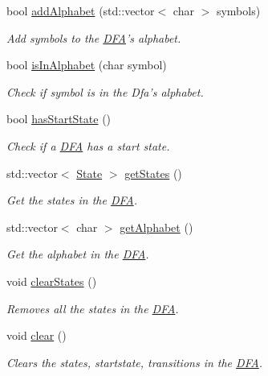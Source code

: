 \begin{DoxyCompactItemize}
bool \hyperlink{classFA_1_1DFA_a27f8b400bc8d0512a8527d6c71996869}{add\-Alphabet} (std\-::vector$<$ char $>$ symbols)
\begin{DoxyCompactList}\small\item\em Add symbols to the \hyperlink{classFA_1_1DFA}{D\-F\-A}'s alphabet. \end{DoxyCompactList}\item 
bool \hyperlink{classFA_1_1DFA_a8b9f3bbda0044b4ed8d413f5fa3cd56b}{is\-In\-Alphabet} (char symbol)
\begin{DoxyCompactList}\small\item\em Check if symbol is in the Dfa's alphabet. \end{DoxyCompactList}\item 
bool \hyperlink{classFA_1_1DFA_aec06d82c3ee0efdb193510d35031f36d}{has\-Start\-State} ()
\begin{DoxyCompactList}\small\item\em Check if a \hyperlink{classFA_1_1DFA}{D\-F\-A} has a start state. \end{DoxyCompactList}\item 
std\-::vector$<$ \hyperlink{classFA_1_1State}{State} $>$ \hyperlink{classFA_1_1DFA_a8751b056d570391389fa8a9db459595b}{get\-States} ()
\begin{DoxyCompactList}\small\item\em Get the states in the \hyperlink{classFA_1_1DFA}{D\-F\-A}. \end{DoxyCompactList}\item 
std\-::vector$<$ char $>$ \hyperlink{classFA_1_1DFA_a757d14f06b687278116d971f116cb322}{get\-Alphabet} ()
\begin{DoxyCompactList}\small\item\em Get the alphabet in the \hyperlink{classFA_1_1DFA}{D\-F\-A}. \end{DoxyCompactList}\item 
\hypertarget{classFA_1_1DFA_a7319fa99113f60a2575a2b66c35341bf}{void \hyperlink{classFA_1_1DFA_a7319fa99113f60a2575a2b66c35341bf}{clear\-States} ()}\label{classFA_1_1DFA_a7319fa99113f60a2575a2b66c35341bf}

\begin{DoxyCompactList}\small\item\em Removes all the states in the \hyperlink{classFA_1_1DFA}{D\-F\-A}. \end{DoxyCompactList}\item 
\hypertarget{classFA_1_1DFA_ac6576dd1df2dc56199aa14f22beb09d4}{void \hyperlink{classFA_1_1DFA_ac6576dd1df2dc56199aa14f22beb09d4}{clear} ()}\label{classFA_1_1DFA_ac6576dd1df2dc56199aa14f22beb09d4}

\begin{DoxyCompactList}\small\item\em Clears the states, startstate, transitions in the \hyperlink{classFA_1_1DFA}{D\-F\-A}. \end{DoxyCompactList}\end{DoxyCompactItemize}
